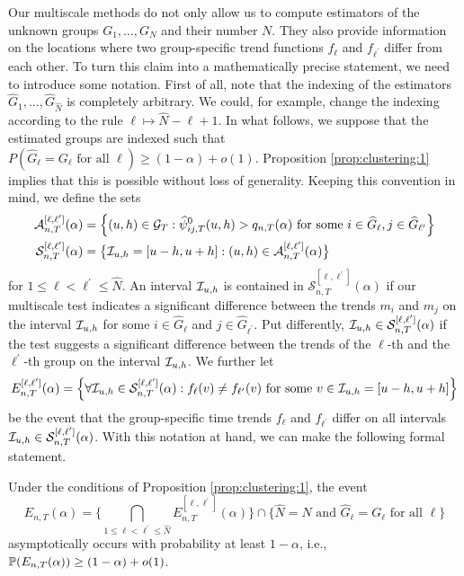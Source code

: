 \documentclass[12pt]{article}
\begin{document}
Our multiscale methods do not only allow us to compute estimators of the unknown groups $G_1,\ldots, G_N$ and their number $N$. They also provide information on the locations where two group-specific trend functions $f_\ell$ and $f_{\ell^\prime}$ differ from each other. To turn this claim into a mathematically precise statement, we need to introduce some notation. First of all, note that the indexing of the estimators $\widehat{G}_1,\ldots,\widehat{G}_{\widehat{N}}$ is completely arbitrary. We could, for example, change the indexing according to the rule $\ell \mapsto \widehat{N} - \ell + 1$. In what follows, we suppose that the estimated groups are indexed such that $P( \widehat{G}_\ell = G_\ell \text{ for all } \ell ) \ge (1-\alpha) + o(1)$. Proposition \ref{prop:clustering:1} implies that this is possible without loss of generality. Keeping this convention in mind, we define the sets 
\begin{align*}
\mathcal{A}_{n,T}^{[\ell,\ell^\prime]}(\alpha) & = \Big\{ (u, h) \in \mathcal{G}_T: \widehat{\psi}^0_{ij, T}(u, h) > q_{n,T}(\alpha) \text{ for some } i \in \widehat{G}_\ell, j \in \widehat{G}_{\ell^\prime} \Big\} \\
\mathcal{S}^{[\ell,\ell^\prime]}_{n, T}(\alpha) & = \big\{ \mathcal{I}_{u, h} = [u-h, u+h]: (u, h) \in \mathcal{A}_{n,T}^{[\ell,\ell^\prime]}(\alpha) \big\}
\end{align*}
for $1 \le \ell < \ell^\prime \le \widehat{N}$. An interval $\mathcal{I}_{u, h}$ is contained in $\mathcal{S}^{[\ell,\ell^\prime]}_{n, T}(\alpha)$ if our multiscale test indicates a significant difference between the trends $m_i$ and $m_j$ on the interval $\mathcal{I}_{u, h}$ for some $i \in \widehat{G}_\ell$ and $j \in \widehat{G}_{\ell^\prime}$. Put differently, $\mathcal{I}_{u, h} \in \mathcal{S}^{[\ell,\ell^\prime]}_{n, T}(\alpha)$ if the test suggests a significant difference between the trends of the $\ell$-th and the $\ell^\prime$-th group on the interval $\mathcal{I}_{u, h}$. We further let
\[ E_{n,T}^{[\ell,\ell^\prime]}(\alpha) = \Big\{ \forall \mathcal{I}_{u, h} \in \mathcal{S}^{[\ell,\ell^\prime]}_{n, T}(\alpha): f_\ell(v) \ne f_{\ell^\prime}(v) \text{ for some } v \in \mathcal{I}_{u, h} = [u-h, u+h] \Big\} \]
be the event that the group-specific time trends $f_\ell$ and $f_{\ell^\prime}$ differ on all intervals $\mathcal{I}_{u, h} \in \mathcal{S}^{[\ell,\ell^\prime]}_{n, T}(\alpha)$. With this notation at hand, we can make the following formal statement.  
\begin{prop}\label{prop:clustering:2}
Under the conditions of Proposition \ref{prop:clustering:1}, the event 
\[ E_{n,T}(\alpha) = \Big\{ \bigcap_{1 \le \ell < \ell^\prime \le \widehat{N}} E_{n,T}^{[\ell,\ell^\prime]}(\alpha) \Big\} \cap \Big\{ \widehat{N} = N \text{ and } \widehat{G}_\ell = G_\ell \text{ for all } \ell \Big\} \]
asymptotically occurs with probability at least $1-\alpha$, i.e., 
$\mathbb{P} ( E_{n,T}(\alpha) ) \ge (1 - \alpha) + o(1)$. 
\end{prop}
\end{document}
